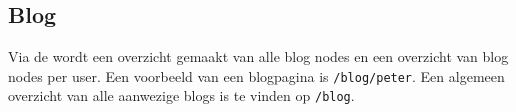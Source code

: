 \subsection{Blog}\label{blog}

Via de  wordt een overzicht gemaakt van alle blog nodes en een overzicht van blog nodes per user. Een voorbeeld van een blogpagina is \texttt{/blog/peter}. Een algemeen overzicht van alle aanwezige blogs is te vinden op \texttt{/blog}. 